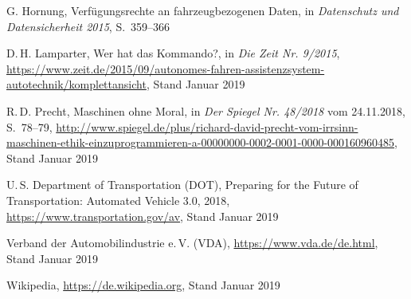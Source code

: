 \documentclass[twoside,a4paper,12pt]{article}
\begin{document}
\begin{thebibliography}{99}
 G. Hornung, Verfügungsrechte an fahrzeugbezogenen Daten, in \textit{Datenschutz und Datensicherheit 2015}, \mbox{S. 359--366}

 D.\,H. Lamparter, Wer hat das Kommando?, in \textit{Die Zeit Nr. 9/2015}, \\
\url{https://www.zeit.de/2015/09/autonomes-fahren-assistenzsystem-autotechnik/komplettansicht}, Stand Januar 2019

 R.\,D. Precht, Maschinen ohne Moral, in \textit{Der Spiegel Nr. 48/2018} vom 24.11.2018, \mbox{S. 78--79},
\url{http://www.spiegel.de/plus/richard-david-precht-vom-irrsinn-maschinen-ethik-einzuprogrammieren-a-00000000-0002-0001-0000-000160960485}, Stand Januar 2019

 U.\,S. Department of Transportation (DOT), Preparing for the Future of Transportation: Automated Vehicle 3.0, 2018,
\url{https://www.transportation.gov/av}, Stand Januar 2019

 Verband der Automobilindustrie e.\,V. (VDA), \url{https://www.vda.de/de.html}, Stand Januar 2019

 Wikipedia, \url{https://de.wikipedia.org}, Stand Januar 2019

\end{thebibliography}

\newpage
\end{document}
